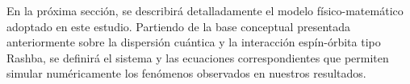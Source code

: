 En la próxima sección, se describirá detalladamente el modelo físico-matemático adoptado en este estudio.
Partiendo de la base conceptual presentada anteriormente sobre la dispersión cuántica y la interacción espín-órbita tipo Rashba, se definirá el sistema y las ecuaciones correspondientes que permiten simular numéricamente los fenómenos observados en nuestros resultados.


%
%
%
%
%
